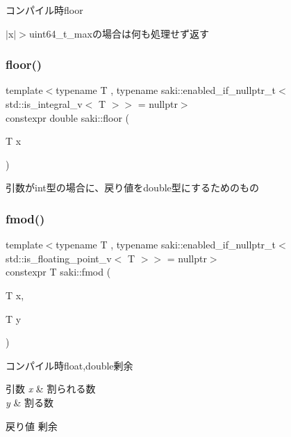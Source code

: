 コンパイル時floor 

$\vert$x$\vert$$>$uint64\+\_\+t\+\_\+maxの場合は何も処理せず返す \mbox{\label{namespacesaki_a327cd6800fef212948644f69cb31d4ff}} 
\subsubsection{\texorpdfstring{floor()}{floor()}\hspace{0.1cm}{\footnotesize\ttfamily [2/2]}}
{\footnotesize\ttfamily template$<$typename T , typename saki\+::enabled\+\_\+if\+\_\+nullptr\+\_\+t$<$ std\+::is\+\_\+integral\+\_\+v$<$ T $>$$>$  = nullptr$>$ \\
constexpr double saki\+::floor (\begin{DoxyParamCaption}\item[{T}]{x }\end{DoxyParamCaption})}



引数がint型の場合に、戻り値をdouble型にするためのもの 

\mbox{\label{namespacesaki_a8a7b926b9d370e4a9aed84579675222c}} 
\subsubsection{\texorpdfstring{fmod()}{fmod()}\hspace{0.1cm}{\footnotesize\ttfamily [1/2]}}
{\footnotesize\ttfamily template$<$typename T , typename saki\+::enabled\+\_\+if\+\_\+nullptr\+\_\+t$<$ std\+::is\+\_\+floating\+\_\+point\+\_\+v$<$ T $>$$>$  = nullptr$>$ \\
constexpr T saki\+::fmod (\begin{DoxyParamCaption}\item[{T}]{x,  }\item[{T}]{y }\end{DoxyParamCaption})}



コンパイル時float,double剰余 


\begin{DoxyParams}{引数}
{\em x} & 割られる数 \\
\hline
{\em y} & 割る数 \\
\hline
\end{DoxyParams}
\begin{DoxyReturn}{戻り値}
剰余 
\end{DoxyReturn}
\mbox{\label{namespacesaki_ac9d00b62957aebad23850e2f470a8d9c}} 
